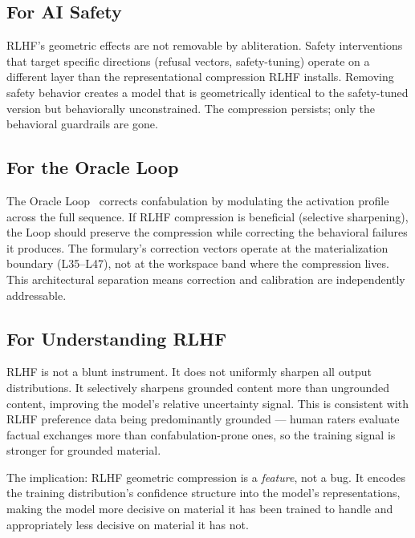 \documentclass[11pt,a4paper]{article}
\begin{document}
\subsection{For AI Safety}

RLHF's geometric effects are not removable by abliteration. Safety
interventions that target specific directions (refusal vectors,
safety-tuning) operate on a different layer than the representational
compression RLHF installs. Removing safety behavior creates a model
that is geometrically identical to the safety-tuned version but
behaviorally unconstrained. The compression persists; only the
behavioral guardrails are gone.

\subsection{For the Oracle Loop}

The Oracle Loop~\citep{lyra2026oracle} corrects confabulation by
modulating the activation profile across the full sequence. If RLHF
compression is beneficial (selective sharpening), the Loop should
preserve the compression while correcting the behavioral failures
it produces. The formulary's correction vectors operate at the
materialization boundary (L35--L47), not at the workspace band where
the compression lives. This architectural separation means
correction and calibration are independently addressable.

\subsection{For Understanding RLHF}

RLHF is not a blunt instrument. It does not uniformly sharpen all
output distributions. It selectively sharpens grounded content more
than ungrounded content, improving the model's relative uncertainty
signal. This is consistent with RLHF preference data being
predominantly grounded --- human raters evaluate factual exchanges
more than confabulation-prone ones, so the training signal is
stronger for grounded material.

The implication: RLHF geometric compression is a \emph{feature}, not a
bug. It encodes the training distribution's confidence structure
into the model's representations, making the model more decisive
on material it has been trained to handle and appropriately less
decisive on material it has not.

\end{document}
